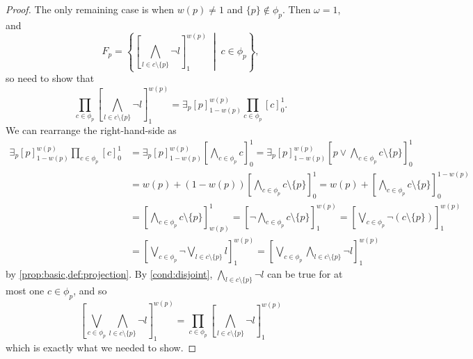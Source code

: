 \documentclass{article}
\theoremstyle{definition}
\theoremstyle{remark}
\begin{document}
\begin{proof}
  The only remaining case is when $w(p) \ne 1$ and $\{ p \} \not \in \phi_p$.
  Then $\omega = 1$, and
  \[
    F_p = \left\{ \left[\bigwedge_{l \in c \setminus \{ p \}} \neg
        l\right]_1^{w(p)} \;\middle|\; c \in \phi_p \right\},
  \]
  so need to show that
  \[
    \prod_{c \in \phi_p} \left[\bigwedge_{l \in c \setminus \{ p \}} \neg
      l\right]_1^{w(p)} = \exists_p [p]_{1-w(p)}^{w(p)} \prod_{c \in \phi_p}
    [c]_0^1.
  \]
  We can rearrange the right-hand-side as
  \begin{align*}
    \exists_p [p]_{1-w(p)}^{w(p)} \prod_{c \in \phi_p} [c]_0^1 &= \exists_p [p]_{1-w(p)}^{w(p)} \left[\bigwedge_{c \in \phi_p} c\right]_0^1 = \exists_p [p]_{1-w(p)}^{w(p)} \left[ p \lor \bigwedge_{c \in \phi_p} c \setminus \{ p \} \right]_0^1 \\
                                                               &= w(p) + (1-w(p)) \left[ \bigwedge_{c \in \phi_p} c \setminus \{ p \} \right]_0^1 = w(p) + \left[ \bigwedge_{c \in \phi_p} c \setminus \{ p \} \right]_0^{1-w(p)} \\
                                                               &= \left[ \bigwedge_{c \in \phi_p} c \setminus \{ p \} \right]_{w(p)}^1 = \left[ \neg \bigwedge_{c \in \phi_p} c \setminus \{ p \} \right]_1^{w(p)} = \left[ \bigvee_{c \in \phi_p} \neg(c \setminus \{ p \}) \right]_1^{w(p)} \\
                                                               &= \left[ \bigvee_{c \in \phi_p} \neg \bigvee_{l \in c \setminus \{ p \}} l \right]_1^{w(p)} = \left[ \bigvee_{c \in \phi_p} \bigwedge_{l \in c \setminus \{ p \}} \neg l \right]_1^{w(p)}
  \end{align*}
   by \cref{prop:basic,def:projection}. By \cref{cond:disjoint}, $\bigwedge_{l
     \in c \setminus \{ p \}} \neg l$ can be true for at most one $c \in
   \phi_p$, and so
   \[
     \left[ \bigvee_{c \in \phi_p} \bigwedge_{l \in c \setminus \{ p \}} \neg l
     \right]_1^{w(p)} = \prod_{c \in \phi_p} \left[ \bigwedge_{l \in c \setminus
         \{ p \}} \neg l \right]_1^{w(p)}
   \]
   which is exactly what we needed to show.
\end{proof}
\end{document}
